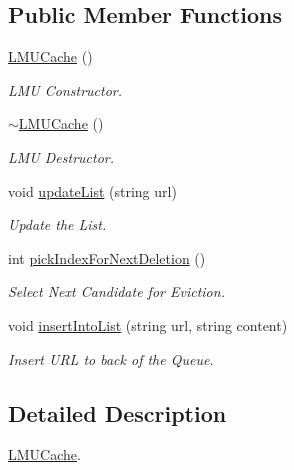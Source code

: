 \subsection*{\-Public \-Member \-Functions}
\begin{DoxyCompactItemize}
\item 
\hypertarget{classLMUCache_a315045011c84226323bc88f52628d910}{\hyperlink{classLMUCache_a315045011c84226323bc88f52628d910}{\-L\-M\-U\-Cache} ()}\label{classLMUCache_a315045011c84226323bc88f52628d910}

\begin{DoxyCompactList}\small\item\em \-L\-M\-U \-Constructor. \end{DoxyCompactList}\item 
\hypertarget{classLMUCache_a59889726c35a2f2a6f6b873f94dd2e87}{\hyperlink{classLMUCache_a59889726c35a2f2a6f6b873f94dd2e87}{$\sim$\-L\-M\-U\-Cache} ()}\label{classLMUCache_a59889726c35a2f2a6f6b873f94dd2e87}

\begin{DoxyCompactList}\small\item\em \-L\-M\-U \-Destructor. \end{DoxyCompactList}\item 
void \hyperlink{classLMUCache_a00f0c220918265d669ae49eb71b179a9}{update\-List} (string url)
\begin{DoxyCompactList}\small\item\em \-Update the \-List. \end{DoxyCompactList}\item 
int \hyperlink{classLMUCache_abe671d7cb4d2fa3455fca1d4e2d9a8a4}{pick\-Index\-For\-Next\-Deletion} ()
\begin{DoxyCompactList}\small\item\em \-Select \-Next \-Candidate for \-Eviction. \end{DoxyCompactList}\item 
void \hyperlink{classLMUCache_aa284a631c7725948fdcfe9715ad4b420}{insert\-Into\-List} (string url, string content)
\begin{DoxyCompactList}\small\item\em \-Insert \-U\-R\-L to back of the \-Queue. \end{DoxyCompactList}\end{DoxyCompactItemize}


\subsection{\-Detailed \-Description}
\hyperlink{classLMUCache}{\-L\-M\-U\-Cache}. 

